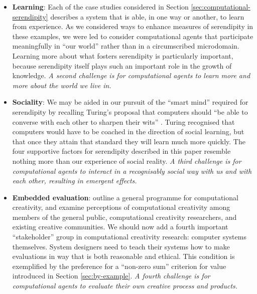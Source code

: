 \begin{itemize}
\item \textbf{Learning}: Each of the case studies considered in
  Section \ref{sec:computational-serendipity} describes a system that
  is able, in one way or another, to learn from experience.  As we
  considered ways to enhance measures of serendipity in these
  examples, we were led to consider computational agents that
  participate meaningfully in ``our world'' rather than in a
  circumscribed microdomain.  Learning more about what fosters
  serendipity is particularly important, because serendipity itself
  plays such an important role in the growth of knowledge.  \emph{A
    second challenge is for computational agents to learn more and
    more about the world we live in.}
\end{itemize}

\begin{itemize}
\item \textbf{Sociality}: We may be aided in our pursuit of the
  ``smart mind'' required for serendipity by recalling Turing's
  proposal that computers should ``be able to converse with each other
  to sharpen their wits'' \cite{turing-intelligent}.  Turing
  recognised that computers would have to be coached in the direction
  of social learning, but that once they attain that standard they
  will learn much more quickly.  The four supportive factors for
  serendipity described in this paper resemble nothing more than our
  experience of social reality.  \emph{A third challenge is for
    computational agents to interact in a recognisably social way with
    us and with each other, resulting in emergent effects.}
\end{itemize}

\begin{itemize}
\item \textbf{Embedded evaluation}:
   outline a general programme
  for computational creativity, and examine perceptions of computational creativity among members of the general public,
  computational creativity researchers, and existing creative
  communities.  We should now add a fourth important ``stakeholder''
  group in computational creativity research: computer systems
  themselves.  System designers need to teach their systems how to
  make evaluations in way that is both reasonable and ethical.  This
  condition is exemplified by the preference for a ``non-zero sum''
  criterion for value introduced in Section \ref{sec:by-example}.
  \emph{A fourth challenge is for computational agents to evaluate
    their own creative process and products.}
\end{itemize}


